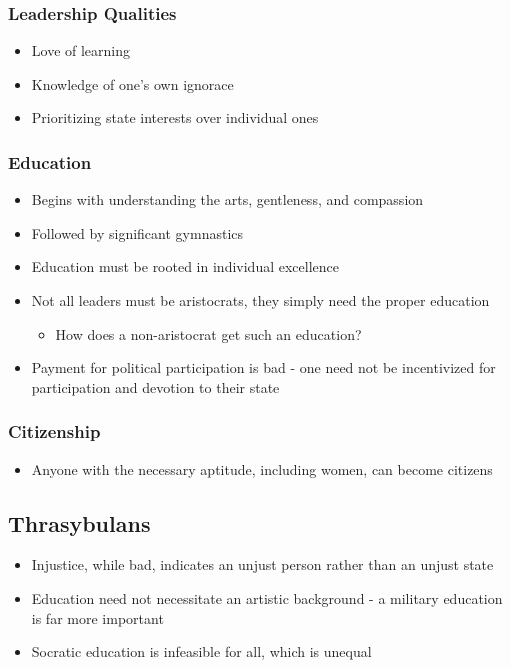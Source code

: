 \documentclass[11pt]{article}
\begin{document}
\subsubsection{Leadership Qualities}
\label{sec:orgb628ef9}
\begin{itemize}
\item Love of learning
\item Knowledge of one's own ignorace
\item Prioritizing state interests over individual ones
\end{itemize}
\subsubsection{Education}
\label{sec:org2df1d7b}
\begin{itemize}
\item Begins with understanding the arts, gentleness, and compassion
\item Followed by significant gymnastics
\item Education must be rooted in individual excellence
\item Not all leaders must be aristocrats, they simply need the proper education
\begin{itemize}
\item How does a non-aristocrat get such an education?
\end{itemize}
\item Payment for political participation is bad - one need not be incentivized for
participation and devotion to their state
\end{itemize}
\subsubsection{Citizenship}
\label{sec:orgfb52424}
\begin{itemize}
\item Anyone with the necessary aptitude, including women, can become citizens
\end{itemize}
\subsection{Thrasybulans}
\label{sec:orga72bc55}
\begin{itemize}
\item Injustice, while bad, indicates an unjust person rather than an unjust state
\item Education need not necessitate an artistic background - a military education is far more important
\item Socratic education is infeasible for all, which is unequal
\end{itemize}
\end{document}
